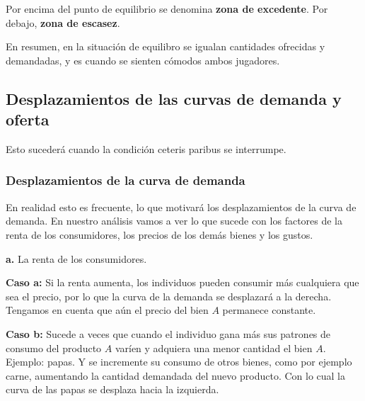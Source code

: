 Por encima del punto de equilibrio se denomina \textbf{zona de excedente}.
Por debajo, \textbf{zona de escasez}.

En resumen, en la situación de equilibro se igualan cantidades ofrecidas y demandadas,
y es cuando se sienten cómodos ambos jugadores.

\subsection{Desplazamientos de las curvas de demanda y oferta}

Esto sucederá cuando la condición ceteris paribus se interrumpe.

\subsubsection{Desplazamientos de la curva de demanda}

En realidad esto es frecuente, lo que motivará los desplazamientos de la curva de demanda.
En nuestro análisis vamos a ver lo que sucede con los factores de la renta de los consumidores,
los precios de los demás bienes y los gustos.

\textbf{a.} La renta de los consumidores.

\textbf{Caso a:} Si la renta aumenta,
los individuos pueden consumir más cualquiera que sea el precio,
por lo que la curva de la demanda se desplazará a la derecha.
Tengamos en cuenta que aún el precio del bien \(A\)
permanece constante.

\begin{center}
\end{center}

\textbf{Caso b:}
Sucede a veces que cuando el individuo gana más sus patrones de consumo del producto \(A\)
varíen y adquiera una menor cantidad el bien \(A\). Ejemplo: papas.
Y se incremente su consumo de otros bienes, como por ejemplo carne,
aumentando la cantidad demandada del nuevo producto.
Con lo cual la curva de las papas se desplaza hacia la izquierda.

